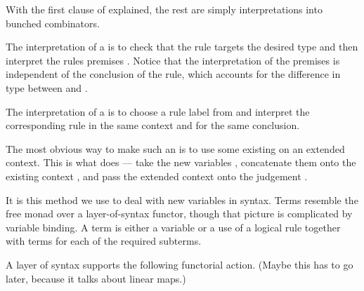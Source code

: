 With the first clause of  explained,
the rest are simply interpretations into bunched combinators.


The interpretation of a  is to check that the rule targets
the desired type and then interpret the rules premises .
Notice that the interpretation of the premises is independent of the conclusion
of the rule, which accounts for the difference in type between
 and
.


The interpretation of a  is to choose a rule label
 from  and interpret the corresponding rule
\AgdaSpace{} in the same context and for the same
conclusion.


The most obvious way to make such an  is to use some existing
 on an extended context.
This is what  does --- take the new variables
\AgdaBound{$\Delta$}, concatenate them onto the existing context
\AgdaBound{$\Gamma$}, and pass the extended context onto the judgement
.


It is this method we use to deal with new variables in syntax.
Terms resemble the free monad over a layer-of-syntax functor, though that
picture is complicated by variable binding.
A term is either a variable or a use of a logical rule together with terms
for each of the required subterms.



A layer of syntax supports the following functorial action.
{\color{red}(Maybe this has to go later, because it talks about linear maps.)}

